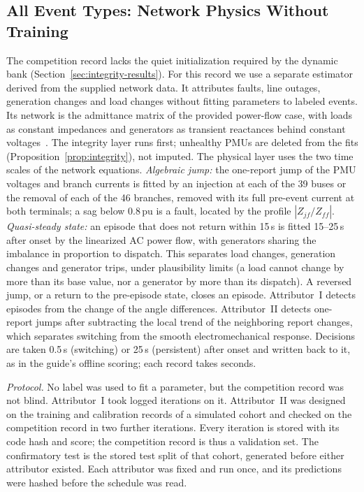 \subsection{All Event Types: Network Physics Without Training}
\label{sec:allevents}

The competition record lacks the quiet initialization required by the
dynamic bank (Section~\ref{sec:integrity-results}). For this record we
use a separate estimator derived from the supplied network data. It
attributes faults, line outages, generation changes and load changes
without fitting parameters to labeled events. Its
network is the admittance matrix of the provided power-flow case, with
loads as constant impedances and generators as transient reactances
behind constant voltages~\cite{pai1989energy}. The integrity layer runs
first; unhealthy PMUs are deleted from the fits
(Proposition~\ref{prop:integrity}), not imputed. The physical layer uses
the two time scales of the network equations. \emph{Algebraic jump:}
the one-report jump of the PMU voltages and branch currents is fitted by
an injection at each of the 39 buses or the removal of each of the 46
branches, removed with its full pre-event current at both terminals; a
sag below 0.8\,pu is a fault, located by the profile $|Z_{jf}/Z_{ff}|$.
\emph{Quasi-steady state:} an episode that does not return within 15\,s is
fitted 15--25\,s after onset by the linearized AC power flow, with
generators sharing the imbalance in proportion to dispatch. This
separates load changes, generation changes and generator trips, under
plausibility limits (a load cannot change by more than its base value,
nor a generator by more than its dispatch). A reversed jump, or a return
to the pre-episode state, closes an episode. Attributor~I detects
episodes from the change of the angle differences. Attributor~II detects
one-report jumps after subtracting the local trend of the neighboring
report changes, which separates switching from the smooth
electromechanical response. Decisions are taken 0.5\,s (switching) or
25\,s (persistent) after onset and written back to it, as in the guide's
offline scoring; each record takes seconds.

\emph{Protocol.} No label was used to fit a parameter, but the
competition record was not blind. Attributor~I took \AERawIterOne{}
logged iterations on it. Attributor~II was designed on the training and
calibration records of a simulated cohort and checked on the competition
record in two further iterations. Every iteration is stored with its code hash
and score; the competition record is thus a validation set.
The confirmatory test is the stored test split of that cohort, generated
before either attributor existed. Each attributor was fixed and run
once, and its predictions were hashed before the schedule was read.

